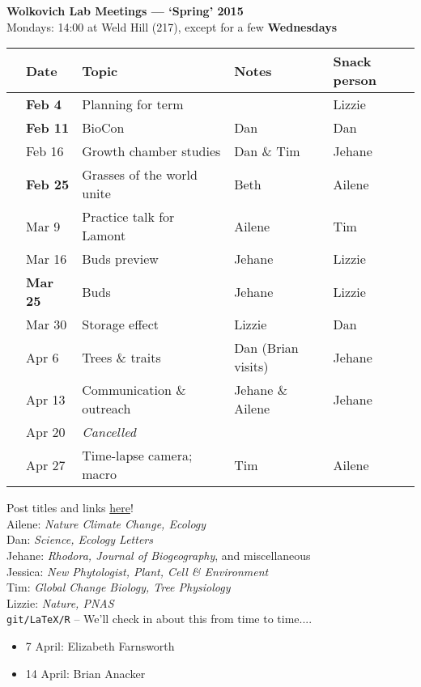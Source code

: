 \documentclass[11pt]{article}
\newenvironment{smitemize}{
\begin{itemize}
  \setlength{\itemsep}{0pt}
  \setlength{\parskip}{0.8pt}
  \setlength{\parsep}{0pt}}
{\end{itemize}
}
\begin{document}
 
\raggedright
{}

\begin{center} 
{\large \textbf{Wolkovich Lab Meetings --- `Spring' 2015}} \\ [2pt]
Mondays: 14:00 at Weld Hill (217), except for a few {\bf Wednesdays}\\
\end{center} 

\begin{center}
\begin{tabular}{ p{0.7 cm}  p{1.5 cm}  p{5 cm}  p{5 cm}  p{1.5 cm} }  \hline \hline
 & \textbf{Date}
   & \textbf{Topic}
      & \textbf{Notes} 
         & \textbf{Snack person} \\ 
\hline \hline
 & {\bf Feb 4}  & Planning for term  &        & Lizzie \\\hline
 & {\bf Feb 11}  & BioCon   & Dan  & Dan  \\\hline
 & Feb 16  & Growth chamber studies & Dan \& Tim     &   Jehane  \\\hline
 & {\bf Feb 25} & Grasses of the world unite & Beth  & Ailene  \\\hline
 & Mar 9 & Practice talk for Lamont & Ailene       & Tim  \\\hline
 & Mar 16 & Buds preview    & Jehane & Lizzie \\\hline
 & {\bf Mar 25} &  Buds &  Jehane      & Lizzie \\\hline
 & Mar 30 & Storage effect   & Lizzie  & Dan  \\\hline
 & Apr  6 &  Trees \& traits  &  Dan (Brian visits) & Jehane \\\hline
 & Apr 13 &  Communication \& outreach  & Jehane \& Ailene & Jehane  \\\hline
 & Apr 20 & \emph{Cancelled} & &    \\\hline
 & Apr 27 &   Time-lapse camera; macro  & Tim      & Ailene\\\hline
\hline
\end{tabular}
\end{center}
\vspace{6pt}
 Post titles and links \href{https://docs.google.com/document/d/1j0WdDbjdp8ERLSO7whvtnP-tOblYMlX33TSCXy_uRKo/edit?usp=sharing}{here}!\\
Ailene: \emph{Nature Climate Change, Ecology}\\
Dan: \emph{Science, Ecology Letters}\\
Jehane: \emph{Rhodora, Journal of Biogeography}, and miscellaneous\\
Jessica: \emph{New Phytologist, Plant, Cell \& Environment}\\
Tim: \emph{Global Change Biology, Tree Physiology}\\
Lizzie: \emph{Nature, PNAS}\\
\vspace{6pt}
 \verb|git/LaTeX/R| -- We'll check in about this from time to time....\\
\vspace{2ex}

\begin{smitemize}
\item 7 April: Elizabeth Farnsworth
\item 14 April: Brian Anacker
\end{smitemize}
\end{document}
